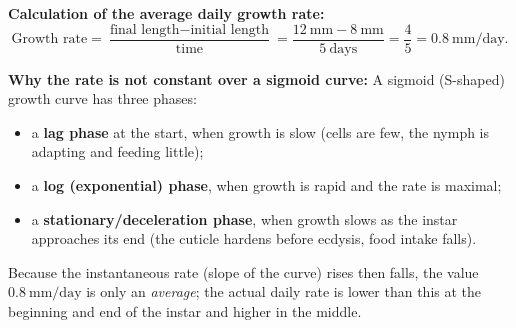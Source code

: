 \documentclass[11pt]{article}
\newcounter{popsec}
\newcounter{popsub}
\newcommand{\courssub}[1]{%
  \stepcounter{popsub}%
  \par\vspace{9pt}\noindent{\popxbold\fontsize{11.5}{13}\selectfont\color{popink}{\color{poporange}\thepopsec.\thepopsub}\hspace{6pt}#1}\par\nopagebreak\vspace{4pt}
}
\begin{document}
\begin{corrige}
\textbf{Calculation of the average daily growth rate:}
\[
\text{Growth rate} = \frac{\text{final length} - \text{initial length}}{\text{time}} = \frac{12\ \mathrm{mm} - 8\ \mathrm{mm}}{5\ \mathrm{days}} = \frac{4}{5} = 0.8\ \mathrm{mm/day}.
\]

\textbf{Why the rate is not constant over a sigmoid curve:}
A sigmoid (S-shaped) growth curve has three phases:
\begin{itemize}
\item a \textbf{lag phase} at the start, when growth is slow (cells are few, the nymph is adapting and feeding little);
\item a \textbf{log (exponential) phase}, when growth is rapid and the rate is maximal;
\item a \textbf{stationary/deceleration phase}, when growth slows as the instar approaches its end (the cuticle hardens before ecdysis, food intake falls).
\end{itemize}
Because the instantaneous rate (slope of the curve) rises then falls, the value $0.8\ \mathrm{mm/day}$ is only an \emph{average}; the actual daily rate is lower than this at the beginning and end of the instar and higher in the middle.
\end{corrige}

\courssub{I practise}
\end{document}
